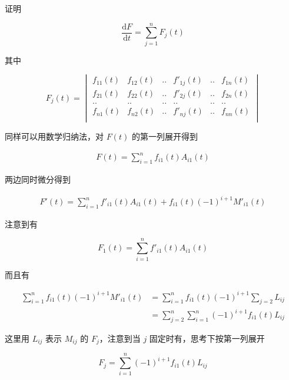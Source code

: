 \documentclass[12pt,a4paper]{ctexart}
\begin{document}
证明 

\[
\frac{\text{d} F}{\text{d}t} = \sum_{j=1}^{n}F_j(t)
\]

其中 

\[
F_j(t) = \begin{vmatrix}
f_{11}(t) & f_{12}(t) & .. & f'_{1j}(t) & .. & f_{1n}(t)\\
f_{21}(t) & f_{22}(t) & .. & f'_{2j}(t) & .. & f_{2n}(t)\\
.. & .. & .. & .. & .. & .. \\
f_{n1}(t) & f_{n2}(t) & .. & f'_{nj}(t) & .. & f_{nn}(t)\\
\end{vmatrix}
\]

同样可以用数学归纳法，对 $F(t)$ 的第一列展开得到

\begin{align*}
F(t) = \sum_{i=1}^{n}f_{i1}(t)A_{i1}(t)
\end{align*}

两边同时微分得到

\begin{align*}
F'(t) = \sum_{i=1}^{n}f'_{i1}(t)A_{i1}(t) + f_{i1}(t)(-1)^{i+1}M'_{i1}(t)
\end{align*}

注意到有

\[
F_1(t) = \sum_{i=1}^{n}f'_{i1}(t)A_{i1}(t)
\]

而且有

\begin{align*}
\sum_{i=1}^{n}f_{i1}(t)(-1)^{i+1}M'_{i1}(t) &= \sum_{i=1}^{n}f_{i1}(t)(-1)^{i+1} \sum_{j=2}L_{ij} \\ 
&= \sum_{j=2}^{n}\sum_{i=1}^{n}(-1)^{i+1}f_{i1}(t)L_{ij}
\end{align*}

这里用 $L_{ij}$ 表示 $M_{ij}$ 的 $F_j$，注意到当 $j$ 固定时有，思考下按第一列展开

\[
F_j = \sum_{i=1}^{n}(-1)^{i+1}f_{i1}(t)L_{ij}
\]
\end{document}
